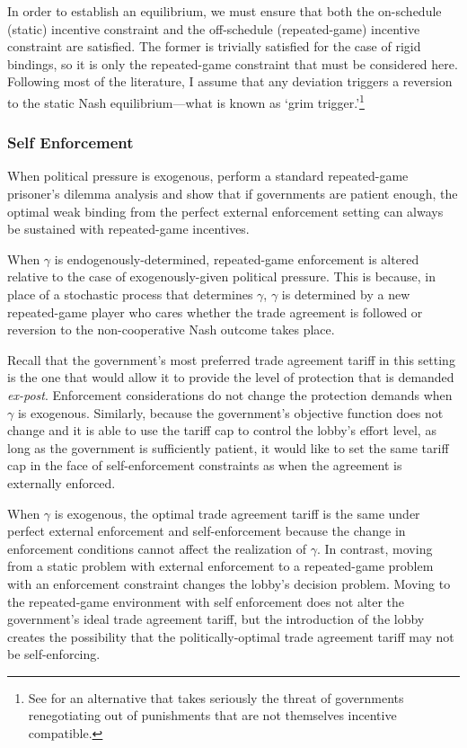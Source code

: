 \documentclass[12pt,titlepage]{article}
\newcommand{\ga}{\gamma}
\begin{document}
In order to establish an equilibrium, we must ensure that both the on-schedule (static) incentive constraint and the off-schedule (repeated-game) incentive constraint are satisfied. The former is trivially satisfied for the case of rigid bindings, so it is only the repeated-game constraint that must be considered here. Following most of the literature, I assume that any deviation triggers a reversion to the static Nash equilibrium---what is known as `grim trigger.'\footnote{See \Textcite{krw} for an alternative that takes seriously the threat of governments renegotiating out of punishments that are not themselves incentive compatible.\label{fn:krw}}
	
\subsubsection{Self Enforcement}
\label{sec:selfweak}
When political pressure is exogenous, \Textcite{bs2005} perform a standard repeated-game prisoner's dilemma analysis and show that if governments are patient enough, the optimal weak binding from the perfect external enforcement setting can always be sustained with repeated-game incentives.

When $\ga$ is endogenously-determined, repeated-game enforcement is altered relative to the case of exogenously-given political pressure. This is because, in place of a stochastic process that determines $\ga$, $\ga$ is determined by a new repeated-game player who cares whether the trade agreement is followed or reversion to the non-cooperative Nash outcome takes place.

Recall that the government's most preferred trade agreement tariff in this setting is the one that would allow it to provide the level of protection that is demanded \textit{ex-post}. Enforcement considerations do not change the protection demands when $\ga$ is exogenous. Similarly, because the government's objective function does not change and it is able to use the tariff cap to control the lobby's effort level, as long as the government is sufficiently patient, it would like to set the same tariff cap in the face of self-enforcement constraints as when the agreement is externally enforced.

When $\ga$ is exogenous, the optimal trade agreement tariff is the same under perfect external enforcement and self-enforcement because the change in enforcement conditions cannot affect the realization of $\ga$. In contrast, moving from a static problem with external enforcement to a repeated-game problem with an enforcement constraint changes the lobby's decision problem. Moving to the repeated-game environment with self enforcement does not alter the government's ideal trade agreement tariff, but the introduction of the lobby creates the possibility that the politically-optimal trade agreement tariff may not be self-enforcing.
\end{document}
